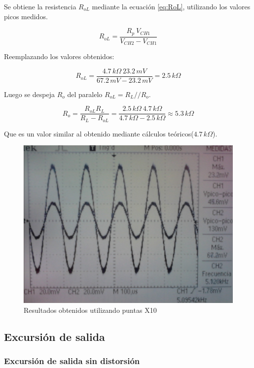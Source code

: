 \documentclass[10pt,spanish,a4paper,notitlepage]{article}
\begin{document}
Se obtiene la resistencia $R_{oL}$ mediante la ecuación \ref{eq:RoL},
utilizando los valores picos medidos.

\begin{equation}
    R_{oL} = \frac{R_p\ V_{CH1}}{V_{CH2} - V_{CH1}}
\label{eq:RoL}
\end{equation}

Reemplazando los valores obtenidos:

\[ \displaystyle R_{oL} = \frac{4.7\,\unit{k\Omega}\ 23.2\,\unit{mV}}{67.2\,\unit{mV} - 23.2\,\unit{mV}} 
= 2.5\,\unit{k\Omega} \]

Luego se despeja $R_o$ del paralelo $R_{oL} = R_L // R_o$.

\[ \displaystyle R_o = \frac{R_{oL}R_L}{R_L - R_{oL}}
= \frac{2.5\,\unit{k\Omega}\ 4.7\,\unit{k\Omega}}{4.7\,\unit{k\Omega} - 2.5\,\unit{k\Omega}} 
\approx 5.3\,\unit{k\Omega} \]

Que es un valor similar al obtenido mediante cálculos teóricos($4.7\,\unit{k\Omega}$).

\begin{figure}[H]
\centering
\includegraphics[scale=0.12]{mediciones/Ro_puntaX10.jpg}
\caption{Resultados obtenidos utilizando puntas X10}
\label{fig:medicion_Ro}
\end{figure}


\subsection{Excursión de salida}

\subsubsection{Excursión de salida sin distorsión}
\end{document}
